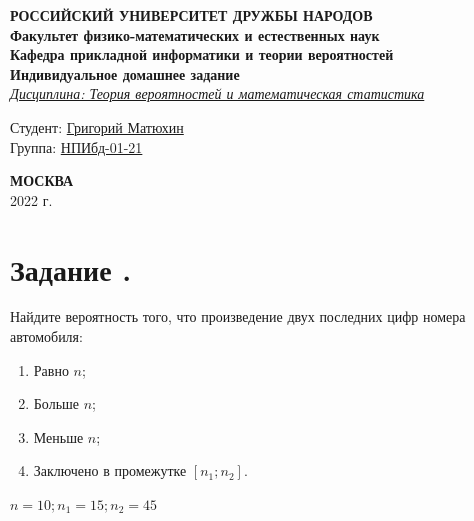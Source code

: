 \documentclass[12pt]{article}
\begin{document}
\begin{titlepage}

	\begin{center}
		\hfill \break
		\textbf{
			\large{РОССИЙСКИЙ УНИВЕРСИТЕТ ДРУЖБЫ НАРОДОВ}\\
			\normalsize{Факультет физико-математических и естественных наук}\\
			\normalsize{Кафедра прикладной информатики и теории вероятностей}\\
		}
		\vspace*{\fill}
		\Large{\textbf{Индивидуальное домашнее задание }}
		\\
		\underline{\textit{\normalsize{Дисциплина: Теория вероятностей и математическая статистика}}}
		\vspace*{\fill}

	\end{center}

	\begin{flushright}
		Студент: \underline{Григорий Матюхин}\\ \vspace{0.5cm}
		Группа: \underline{НПИбд-01-21}
	\end{flushright}


	\begin{center} \textbf{МОСКВА} \\ 2022 г. \end{center}
	\thispagestyle{empty} %

\end{titlepage}
\newpage
\tableofcontents
\newpage

\section*{Задание .}
Найдите вероятность того, что произведение двух последних цифр номера автомобиля:
\begin{enumerate}
	\item Равно $n$;
	\item Больше $n$;
	\item Меньше $n$;
	\item Заключено в промежутке $[n_1; n_2]$.
\end{enumerate}
$n = 10; n_1 = 15; n_2 = 45$
\end{document}
